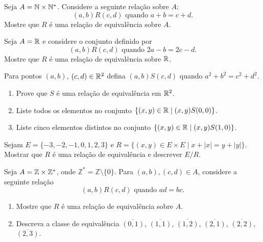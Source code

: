 \documentclass[12pt]{exam}
\begin{document}
\vspace{.3cm}


\questao Seja $A=\mathbb{N}\times \mathbb{N}^*$. Considere a seguinte
rela{\c c}{\~a}o sobre $A$:
\[
(a,b)R (c,d) \mbox{ quando } a + b = c + d.
\]
Mostre que $R$ {\'e} uma rela{\c c}{\~a}o de equival{\^e}ncia sobre $A$.

\vspace{.3cm}

\questao Seja $A = \mathbb{R}$ e considere o conjunto definido por
\[
  (a,b)R(c,d) \mbox{ quando } 2a - b = 2c - d.
\]
Mostre que $R$ \'e uma rela\c{c}\~ao de equival\^encia sobre $\mathbb{R}$.

\vspace{.3cm}

\questao Para pontos $(a, b)$, $(c, d) \in \mathbb{R}^2$ defina $(a, b) S (c, d)$ quando $a^2 + b^2 = c^2 + d^2$.
\begin{enumerate}[label={\alph*})]
  \item Prove que $S$ \'e uma rela\c{c}\~ao de equival\^encia em $\mathbb{R}^2$.
  \item Liste todos os elementos no conjunto $\{(x, y) \in \mathbb{R} \mid (x, y) S (0, 0)\}$.
  \item Liste cinco elementos distintos no conjunto $\{(x, y) \in \mathbb{R} \mid (x, y) S (1, 0)\}$.
\end{enumerate}

\vspace{.3cm}

\questao Sejam $E = \{-3, -2, -1, 0, 1, 2, 3\}$ e $R = \{(x, y) \in E \times E \mid x + |x| = y + |y|\}$. Mostrar que $R$ \'e uma rela\c{c}\~ao de equival\^encia e descrever $E/R$.

\vspace{.3cm}

\questao Seja $A=\mathbb{Z}\times \mathbb{Z}^*$, onde
$\mathbb{Z}^*=\mathbb{Z}\setminus \{0\}$. Para $(a,b), (c,d) \in
A$, considere a seguinte rela{\c c}{\~a}o
\[
(a,b)R (c,d) \mbox{ quando } ad=bc.
\]
\begin{enumerate}[label={\alph*})]
\item Mostre que $R$ {\'e} uma rela{\c c}{\~a}o de equival{\^e}ncia sobre $A$.
\item Descreva a classe de equival{\^e}ncia $\overline{(0,1)}$, $\overline{(1,1)}$, $\overline{(1,2)}$, $\overline{(2,1)}$, $\overline{(2,2)}$, $\overline{(2,3)}$.
\end{enumerate}

\vspace{.3cm}
\end{document}
